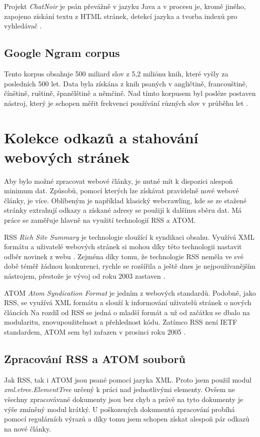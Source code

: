 Projekt \textit{ChatNoir} je psán převážně v jazyku Java a v procesu je, kromě jiného, zapojeno získání textu z
HTML stránek, detekcí jazyka a tvorba indexů pro vyhledávač \cite{CHATNOIR_GIT}.

\section{Google Ngram corpus}
Tento korpus obsahuje 500 miliard slov z 5,2 miliónu knih, které vyšly za posledních 500 let.
Data byla získána z knih psaných v angličtině, francouštině, čínštině, ruštině,
španělštině a němčině. Nad tímto korpusem byl posléze postaven nástroj, který
je schopen měřit frekvenci používání různých slov v průběhu let \cite{NGRAM}.

\chapter{Kolekce odkazů a stahování webových stránek} %
Aby bylo možné zpracovat webové články, je nutné mít k dispozici alespoň minimum dat. Způsobů, pomocí kterých lze získávat pravidelně nové webové
články, je více. Oblíbeným je například klasický webcrawling, kde se ze stažené stránky extrahují odkazy a
získané adresy se použijí k dalšímu sběru dat. Má práce se zaměřuje hlavně na využití technologií RSS a ATOM.

RSS \textit{Rich Site Summary} je technologie sloužící k syndikaci obsahu. Využívá XML formátu a uživatelé
webových stránek si mohou díky této technologii nastavit odběr novinek z webu \cite{RSS}. Zejména díky tomu, že technologie RSS neměla ve
své době téměř žádnou konkurenci, rychle se rozšířila a ještě dnes je nejpoužívanějším nástrojem, přestože je vývoj od roku 2003
zastaven \cite{ATOM_VS_RSS}.

ATOM \textit{Atom Syndication Format} je jedním z webových standardů. Podobně, jako RSS, se využívá XML formátu a slouží k
informování uživatelů stránek o nových článcích \cite{ATOM} Na rozdíl od RSS se jedná o mladší formát a už od začátku se dbalo na
modularitu, znovupoužitelnost a přehlednost kódu. Zatímco RSS není IETF standardem, ATOM sem byl zařazen v prosinci roku 2005 \cite{ATOM_VS_RSS}.

\section{Zpracování RSS a ATOM souborů}
Jak RSS, tak i ATOM jsou psané pomocí jazyka XML. Proto jsem použil modul \textit{xml.etree.ElementTree} určený k práci nad jednotlivými
elementy. Ovšem ne všechny zpracovávané dokumenty jsou bez chyb a právě na tyto dokumenty je výše zmíněný modul krátký. U poškozených
dokumentů zpracování probíhá pomocí regulárních výrazů a díky tomu jsem schopen získat alespoň pár odkazů na nové články.

